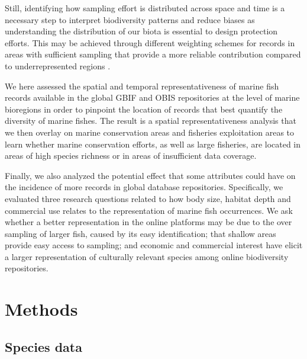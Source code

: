 \documentclass[12pt,authoryear]{elsarticle}
\begin{document}
Still, identifying how sampling effort is distributed across space and time is a necessary step to interpret biodiversity patterns and reduce biases as understanding the distribution of our biota is essential to design protection efforts. This may be achieved through different weighting schemes for records in areas with sufficient sampling that provide a more reliable contribution compared to underrepresented regions \citep{phillips2009, hortal2008, yang2013geographical}. 

We here assessed the spatial and temporal representativeness of marine fish records available in the global GBIF and OBIS repositories at the level of marine bioregions in order to pinpoint the location of records that best quantify the diversity of marine fishes. The result is a spatial representativeness analysis that we then overlay on marine conservation areas \citep{wcmc2022} and fisheries exploitation areas \citep{fao2014} to learn whether marine conservation efforts, as well as large fisheries, are located in areas of high species richness or in areas of insufficient data coverage. 

Finally, we also analyzed the potential effect that some attributes could have on the incidence of more records in global database repositories. Specifically, we evaluated three research questions related to how body size, habitat depth and commercial use relates to the representation of marine fish occurrences. We ask whether a better representation in the online platforms may be due to the over sampling of larger fish, caused by its easy identification; that shallow areas provide easy access to sampling; and economic and commercial interest have elicit a larger representation of culturally relevant species among online biodiversity repositories.  

\section{Methods}
\subsection{Species data}
\label{sec:spp-data}
\end{document}
